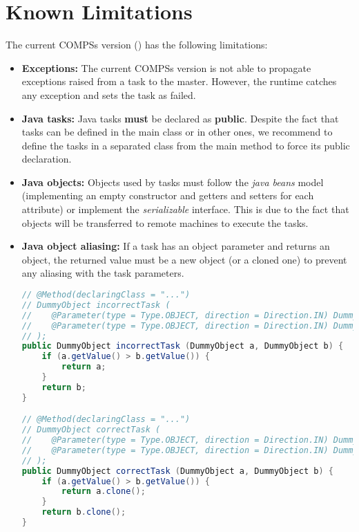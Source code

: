 \section{Known Limitations}
\label{sec:Known_Limitations}

The current COMPSs version (\compssversion) has the following limitations: 
\begin{itemize}
 \item \textbf{Exceptions:} \newline The current COMPSs version is not able to propagate exceptions raised from a task to the master. However, the runtime
 catches any exception and sets the task as failed.
 
 \item \textbf{Java tasks:} \newline Java tasks \textbf{must} be declared as \textbf{public}. Despite the fact that tasks can be
 defined in the main class or in other ones, we recommend to define the tasks in a separated class from the main method to force
 its public declaration.
 
 \item \textbf{Java objects:} \newline Objects used by tasks must follow the \textit{java beans} model (implementing an empty 
 constructor and getters and setters for each attribute) or implement the \textit{serializable} interface. This is due to the 
 fact that objects will be transferred to remote machines to execute the tasks.
 
 \item \textbf{Java object aliasing:} \newline If a task has an object parameter and returns an object, the returned value
 must be a new object (or a cloned one) to prevent any aliasing with the task parameters. 
 \begin{lstlisting}[language=java]
// @Method(declaringClass = "...")
// DummyObject incorrectTask (
//    @Parameter(type = Type.OBJECT, direction = Direction.IN) DummyObject a,
//    @Parameter(type = Type.OBJECT, direction = Direction.IN) DummyObject b
// );
public DummyObject incorrectTask (DummyObject a, DummyObject b) {
    if (a.getValue() > b.getValue()) {
        return a;
    }
    return b;
}

// @Method(declaringClass = "...")
// DummyObject correctTask (
//    @Parameter(type = Type.OBJECT, direction = Direction.IN) DummyObject a,
//    @Parameter(type = Type.OBJECT, direction = Direction.IN) DummyObject b
// );
public DummyObject correctTask (DummyObject a, DummyObject b) {
    if (a.getValue() > b.getValue()) {
        return a.clone();
    }
    return b.clone();
}


\end{lstlisting}
\end{itemize}
